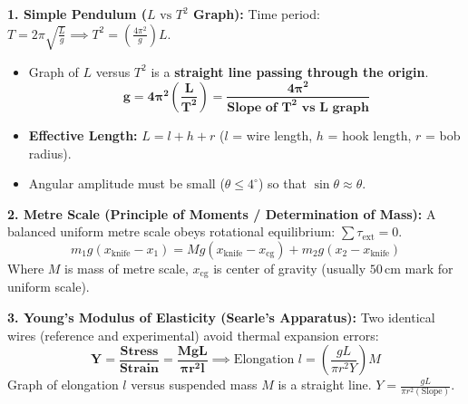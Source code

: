 \documentclass[10pt,a4paper]{article}
\begin{document}
\begin{conceptbox}
\textbf{1. Simple Pendulum ($L \text{ vs } T^2$ Graph):}
Time period: $T = 2\pi\sqrt{\frac{L}{g}} \implies T^2 = \left(\frac{4\pi^2}{g}\right)L$.
\begin{itemize}
  \item Graph of $L$ versus $T^2$ is a \textbf{straight line passing through the origin}.
  \begin{equation}
    \mathbf{g = 4\pi^2 \left(\frac{L}{T^2}\right) = \frac{4\pi^2}{\text{Slope of } T^2 \text{ vs } L \text{ graph}}}
  \end{equation}
  \item \textbf{Effective Length:} $L = l + h + r$ ($l$ = wire length, $h$ = hook length, $r$ = bob radius).
  \item Angular amplitude must be small ($\theta \le 4^\circ$) so that $\sin\theta \approx \theta$.
\end{itemize}
\textbf{2. Metre Scale (Principle of Moments / Determination of Mass):}
A balanced uniform metre scale obeys rotational equilibrium: $\sum \tau_{\mathrm{ext}} = 0$.
\begin{equation}
  m_1 g (x_{\mathrm{knife}} - x_1) = M g (x_{\mathrm{knife}} - x_{\mathrm{cg}}) + m_2 g (x_2 - x_{\mathrm{knife}})
\end{equation}
Where $M$ is mass of metre scale, $x_{\mathrm{cg}}$ is center of gravity (usually $50\,\mathrm{cm}$ mark for uniform scale).

\textbf{3. Young's Modulus of Elasticity (Searle's Apparatus):}
Two identical wires (reference and experimental) avoid thermal expansion errors:
\begin{equation}
  \mathbf{Y = \frac{\text{Stress}}{\text{Strain}} = \frac{M g L}{\pi r^2 l}} \implies \text{Elongation } l = \left(\frac{g L}{\pi r^2 Y}\right) M
\end{equation}
Graph of elongation $l$ versus suspended mass $M$ is a straight line. $Y = \frac{g L}{\pi r^2 (\text{Slope})}$.
\end{conceptbox}
\end{document}
